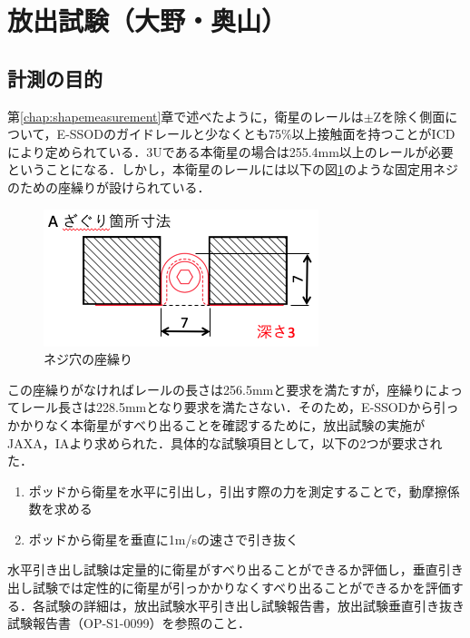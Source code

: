 \section{放出試験（大野・奥山）}
\label{chap:ejectiontest}

\subsection{計測の目的}

第\ref{chap:shapemeasurement}章で述べたように，衛星のレールは$\pm$Zを除く側面について，E-SSODのガイドレールと少なくとも75\%以上接触面を持つことがICDにより定められている．3Uである本衛星の場合は255.4mm以上のレールが必要ということになる．しかし，本衛星のレールには以下の図\ref{fig:hole}のような固定用ネジのための座繰りが設けられている．

\begin{figure}[h]
	\begin{center}
		
		\includegraphics[width=0.6\linewidth]{04/fig/hole.png}
		\caption{ネジ穴の座繰り}
		\label{fig:hole}
		
	\end{center}
\end{figure}

この座繰りがなければレールの長さは256.5mmと要求を満たすが，座繰りによってレール長さは228.5mmとなり要求を満たさない．そのため，E-SSODから引っかかりなく本衛星がすべり出ることを確認するために，放出試験の実施がJAXA，IAより求められた．具体的な試験項目として，以下の2つが要求された．

\begin{enumerate}
	\item ポッドから衛星を水平に引出し，引出す際の力を測定することで，動摩擦係数を求める
	\item ポッドから衛星を垂直に1m/sの速さで引き抜く
\end{enumerate}

水平引き出し試験は定量的に衛星がすべり出ることができるか評価し，垂直引き出し試験では定性的に衛星が引っかかりなくすべり出ることができるかを評価する．各試験の詳細は，放出試験水平引き出し試験報告書，放出試験垂直引き抜き試験報告書（OP-S1-0099）を参照のこと．

